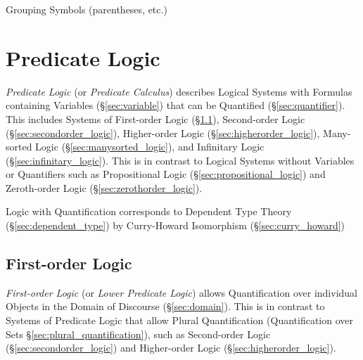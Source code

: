 Grouping Symbols (parentheses, etc.)



\section{Predicate Logic}\label{sec:predicate_logic}

\emph{Predicate Logic} (or \emph{Predicate Calculus}) describes
Logical Systems with Formulas containing Variables
(\S\ref{sec:variable}) that can be Quantified
(\S\ref{sec:quantifier}). This includes Systems of First-order Logic
(\S\ref{sec:firstorder_logic}), Second-order Logic
(\S\ref{sec:secondorder_logic}), Higher-order Logic
(\S\ref{sec:higherorder_logic}), Many-sorted Logic
(\S\ref{sec:manysorted_logic}), and Infinitary Logic
(\S\ref{sec:infinitary_logic}). This is in contrast to Logical Systems
without Variables or Quantifiers such as Propositional Logic
(\S\ref{sec:propositional_logic}) and Zeroth-order Logic
(\S\ref{sec:zerothorder_logic}).

Logic with Quantification corresponds to Dependent Type Theory
(\S\ref{sec:dependent_type}) by Curry-Howard Isomorphism
(\S\ref{sec:curry_howard})



\subsection{First-order Logic}\label{sec:firstorder_logic}

\emph{First-order Logic} (or \emph{Lower Predicate Logic}) allows
Quantification over individual Objects in the Domain of Discourse
(\S\ref{sec:domain}). This is in contrast to Systems of Predicate
Logic that allow Plural Quantification (Quantification over Sets
\S\ref{sec:plural_quantification}), such as Second-order Logic
(\S\ref{sec:secondorder_logic}) and Higher-order Logic
(\S\ref{sec:higherorder_logic}).

